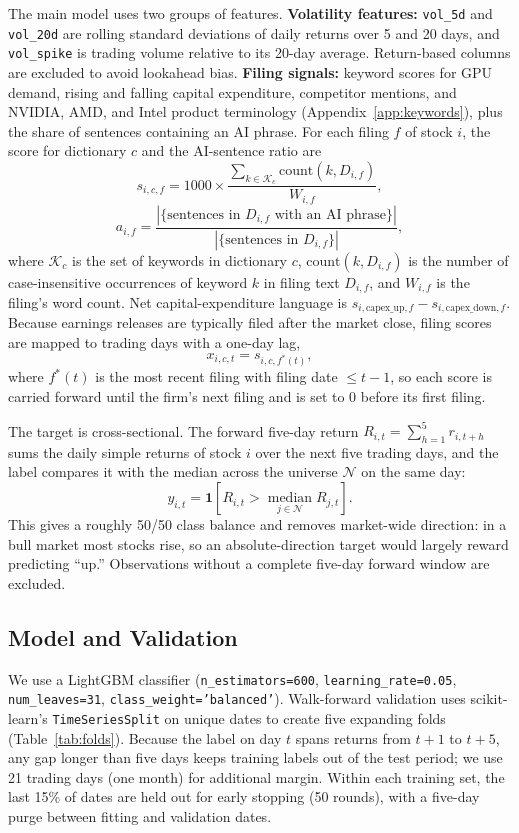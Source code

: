 \documentclass[10pt,letterpaper,twocolumn]{article}
\begin{document}
The main model uses two groups of features. \textbf{Volatility features:} \texttt{vol\_5d} and \texttt{vol\_20d} are rolling standard deviations of daily returns over 5 and 20 days, and \texttt{vol\_spike} is trading volume relative to its 20-day average. Return-based columns are excluded to avoid lookahead bias. \textbf{Filing signals:} keyword scores for GPU demand, rising and falling capital expenditure, competitor mentions, and NVIDIA, AMD, and Intel product terminology (Appendix~\ref{app:keywords}), plus the share of sentences containing an AI phrase. For each filing $f$ of stock $i$, the score for dictionary $c$ and the AI-sentence ratio are
\[
s_{i,c,f} = 1000 \times \frac{\sum_{k \in \mathcal{K}_c} \text{count}(k, D_{i,f})}{W_{i,f}},
\]
\[
a_{i,f} = \frac{\left|\{\text{sentences in } D_{i,f} \text{ with an AI phrase}\}\right|}{\left|\{\text{sentences in } D_{i,f}\}\right|},
\]
where $\mathcal{K}_c$ is the set of keywords in dictionary $c$, $\text{count}(k, D_{i,f})$ is the number of case-insensitive occurrences of keyword $k$ in filing text $D_{i,f}$, and $W_{i,f}$ is the filing's word count. Net capital-expenditure language is $s_{i,\text{capex\_up},f} - s_{i,\text{capex\_down},f}$. Because earnings releases are typically filed after the market close, filing scores are mapped to trading days with a one-day lag,
\[
x_{i,c,t} = s_{i,c,f^*(t)},
\]
where $f^*(t)$ is the most recent filing with filing date $\le t-1$, so each score is carried forward until the firm's next filing and is set to 0 before its first filing.

The target is cross-sectional. The forward five-day return $R_{i,t} = \sum_{h=1}^{5} r_{i,t+h}$ sums the daily simple returns of stock $i$ over the next five trading days, and the label compares it with the median across the universe $\mathcal{N}$ on the same day:
\[
y_{i,t} = \mathbf{1}\!\left[ R_{i,t} > \operatorname*{median}_{j \in \mathcal{N}} R_{j,t} \right].
\]
This gives a roughly 50/50 class balance and removes market-wide direction: in a bull market most stocks rise, so an absolute-direction target would largely reward predicting ``up.'' Observations without a complete five-day forward window are excluded.

\subsection{Model and Validation}
We use a LightGBM classifier (\texttt{n\_estimators=600}, \texttt{learning\_rate=0.05}, \texttt{num\_leaves=31}, \texttt{class\_weight='balanced'}). Walk-forward validation uses scikit-learn's \texttt{TimeSeriesSplit} on unique dates to create five expanding folds (Table~\ref{tab:folds}). Because the label on day $t$ spans returns from $t+1$ to $t+5$, any gap longer than five days keeps training labels out of the test period; we use 21 trading days (one month) for additional margin. Within each training set, the last 15\% of dates are held out for early stopping (50 rounds), with a five-day purge between fitting and validation dates.
\end{document}
